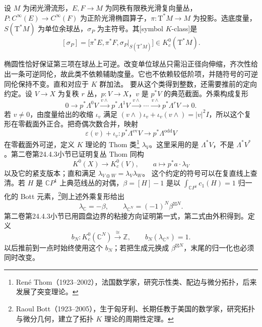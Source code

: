 \begin{definition}\label{g3:def:elliptic-symbol-class}
	设 \(M\) 为闭光滑流形，\(E,F\to M\) 为同秩有限秩光滑复向量丛，\(P:C^\infty(E)\to C^\infty(F)\) 为正阶光滑椭圆算子，\(\pi:\mathrm T^*M\to M\) 为投影。选底度量，\(S(\mathrm T^*M)\) 为单位余球丛，\(\sigma_P\) 为主符号。其[symbol \(K\)-class]是
	\begin{equation}\label{g3:eq:elliptic-symbol-class}
		[\sigma_P]
		=\bigl[\pi^*E,\pi^*F,\sigma_P|_{S(\mathrm T^*M)}\bigr]
		\in K_c^0(\mathrm T^*M).
	\end{equation}
\end{definition}

椭圆性恰好保证第三项在球丛上可逆。改变单位球丛只需沿正径向伸缩，齐次性给出一条可逆同伦，故此类不依赖辅助度量。它也不依赖较低阶项，并随符号的可逆同伦保持不变。直和对应于 \(K\) 群加法。
\ProseParagraphBreak
要从这个类得到整数，还需要推前的定向约定。设 \(V\to X\) 为复秩 \(r\) 丛，\(p:V\to X\)，\(v\) 是 \(p^*V\) 的典范截面。外乘构成复形
\[
	0\longrightarrow p^*\Lambda^0V
	\xrightarrow{\,v\wedge\,}p^*\Lambda^1V
	\xrightarrow{\,v\wedge\,}\cdots
	\xrightarrow{\,v\wedge\,}p^*\Lambda^rV\longrightarrow0.
\]
若 \(v\ne0\)，由度量给出的收缩 \(\iota_v\) 满足
\((v\wedge)\iota_v+\iota_v(v\wedge)=|v|^2I\)，所以这个复形在零截面外正合。把奇偶次数合并，映射
\[
	\varepsilon(v)+\iota_v:
	p^*\Lambda^{\mathrm{ev}}V\longrightarrow p^*\Lambda^{\mathrm{odd}}V
\]
在零截面外可逆，定义 \(K\) 理论的 Thom 类\footnote{René Thom（1923--2002），法国数学家，研究示性类、配边与微分拓扑，后来发展了突变理论。}
\(\lambda_V\)。这里采用的是 \(\Lambda^*V\)，不是 \(\Lambda^*V^*\)。第二卷第24.4.3小节已证明复丛 Thom 同构
\begin{equation}\label{g3:eq:k-thom-index-convention}
	K^0(X)\longrightarrow K_c^0(V),
	\qquad a\longmapsto p^*a\cdot\lambda_V
\end{equation}
以及它的紧支版本；直和满足 \(\lambda_{V\oplus W}=\lambda_V\lambda_W\)。
\ProseParagraphBreak
这个约定的符号可以在复直线上查清。若 \(H\) 是 \(\mathbb CP^1\) 上典范线丛的对偶，\(\beta=[H]-1\) 是以 \(\int_{\mathbb CP^1}c_1(H)=1\) 归一化的 Bott 元素，\footnote{Raoul Bott（1923--2005），生于匈牙利、长期任教于美国的数学家，研究拓扑与微分几何，建立了拓扑 \(K\) 理论的周期性定理。}则上述外乘复形给出
\begin{equation}\label{g3:eq:index-bott-normalization}
	\lambda_{\mathbb C}=-\beta,
	\qquad
	\lambda_{\mathbb C^N}=(-1)^N\beta^{\boxtimes N}.
\end{equation}
第二卷第24.4.3小节已用圆盘边界的粘接方向证明第一式，第二式由外积得到。定义
\[
	b_N:K_c^0(\mathbb C^N)\xrightarrow{\cong}\mathbb Z,
	\qquad b_N(\lambda_{\mathbb C^N})=1.
\]
以后推前到一点时始终使用这个 \(b_N\)；若把生成元换成 \(\beta^{\boxtimes N}\)，末尾的归一化也必须同时改变。

